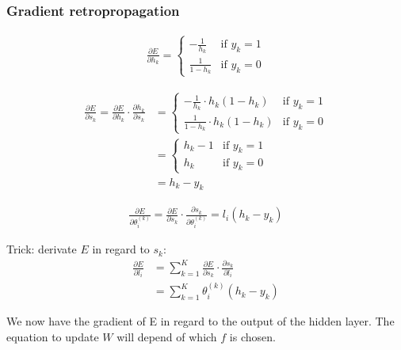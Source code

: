 \subsubsection*{Gradient retropropagation}


\begin{align}
	\frac{ \partial E } { \partial h_k } = \left\{
				    \begin{array}{ll}
				        - \frac{1}{h_k} & \mbox{if } y_k =1 \\
				        \frac{1}{1 - h_k} & \mbox{if } y_k =0
				    \end{array}
				\right.
\end{align}


\begin{align}
	\frac{ \partial E } { \partial s_k } 
		=  
		\frac{ \partial E } { \partial h_k } \cdot \frac{ \partial h_k } { \partial s_k } 
		&=
		\left\{
		    \begin{array}{ll}
		        - \frac{1}{h_k} \cdot h_k (1 - h_k)& \mbox{if } y_k =1 \\
		        \frac{1}{1 - h_k} \cdot h_k (1 - h_k)& \mbox{if } y_k =0
		    \end{array}
		\right. \\
		&=
		\left\{
		    \begin{array}{ll}
		       h_k - 1 & \mbox{if } y_k =1 \\
		        h_k & \mbox{if } y_k =0
		    \end{array}
		\right. \\
		&= h_k - y_k
\end{align}



\begin{align}
	\frac{\partial E}{\partial \theta_i^{(k)}} 
	= 
	\frac{\partial E}{\partial s_k} \cdot \frac{\partial s_k}{\partial \theta_i^{(k)}} 
	= 
	l_i (h_k - y_k)
\end{align}


Trick: derivate $E$ in regard to $s_k$:
\begin{align}
	\frac{\partial E}{\partial l_i} 
	&= 
	\sum_{k=1}^K \frac{\partial E}{\partial s_k} \cdot \frac{\partial s_k}{\partial l_i} \\
	&= 
	\sum_{k=1}^K \theta_i^{(k)} (h_k - y_k)
\end{align}

We now have the gradient of E in regard to the output of the hidden layer. The equation to update $W$ will depend of which $f$ is chosen.

